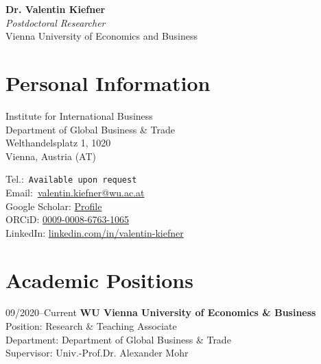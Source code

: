 \documentclass[11pt,a4paper]{article}
\newif\ifPersonalInfo
\newcommand\phone[1]{\href{tel:#1}{{\emailfont #1}}}
\newcommand\email[1]{\href{mailto:#1}{{\emailfont #1}}}
\newcommand\emailfont{\sffamily}
\begin{document}
\begin{cv}

\begin{center}
{\LARGE\textbf{\color{darkblue}Dr. Valentin Kiefner}}\\[6pt]
{\large \textit{Postdoctoral Researcher}}\\
{\large Vienna University of Economics and Business}\\[12pt]
\end{center}

\section{Personal Information}
\begin{cvlist}{}
\item
    Institute for International Business\\
    Department of Global Business \& Trade\\
    Welthandelsplatz 1, 1020\\
    Vienna, Austria (AT)

\item 
    \ifPersonalInfo
        Birth date: 07 March 1994\\
        Place of birth: Hamburg, Germany (DE)\\
        Nationality: German\\
    \fi
    \ifPersonalInfo
        Tel.:~\phone{+43~(1)~31336-5771}\\
    \else
        Tel.:~\texttt{Available upon request}\\
    \fi
    Email:~\email{valentin.kiefner@wu.ac.at}\\
    Google Scholar: \href{https://scholar.google.com/citations?user=JwNZJX0AAAAJ&hl=de&oi=ao}{Profile}\\
    ORCiD: \href{https://orcid.org/0009-0008-6763-1065}{0009-0008-6763-1065}\\
    LinkedIn: \href{https://linkedin.com/in/valentin-kiefner/}{linkedin.com/in/valentin-kiefner}

\end{cvlist}

\section{Academic Positions}
\begin{cvlist}{}
    \item[09/2020--Current]
      {\textbf{WU Vienna University of Economics \& Business}}\\
      {Position:} Research \& Teaching Associate\\
      {Department:} Department of Global Business \& Trade\\
      {Supervisor:} {Univ.-Prof.Dr. Alexander Mohr}
        

\end{cvlist}
\end{cv}
\end{document}

